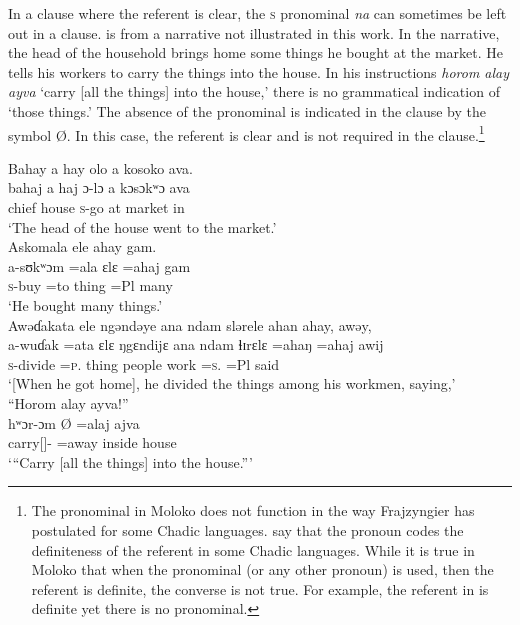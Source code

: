 In a clause where the referent is clear, the \textsc{s} \DO pronominal \textit{na} can sometimes be left out in a clause.  is from a narrative not illustrated in this work. In the narrative, the head of the household brings home some things he bought at the market. He tells his workers to carry the things into the house. In his instructions \textit{horom alay ayva} ‘carry [all the things] into the house,’ there is no grammatical indication of ‘those things.’ The absence of the \DO pronominal is indicated in the clause by the symbol Ø. In this case, the referent is clear and is not required in the clause.\footnote{The \DO pronominal in Moloko does not function in the way Frajzyngier has postulated for some Chadic languages. \citet{FrajzyngierShay2008} say that the \DO pronoun codes the definiteness of the referent in some Chadic languages. While it is true in Moloko that when the \DO pronominal (or any other pronoun) is used, then the referent is definite, the converse is not true. For example, the referent in  is definite yet there is no \DO pronominal. } 

\ea\label{ex:7:43}
Bahay  a  hay  olo  a  kosoko  ava.\\   
\gll bahaj a   haj  ɔ{}-lɔ  a  kɔsɔkʷɔ  ava \\
chief  {\GEN}  house  \textsc{s}-go  at  market  in\\
\glt ‘The head of the house went to the market.’\\
\medskip
Askomala  ele  ahay  gam.\\ 
\gll a-sʊkʷɔm  =ala ɛlɛ =ahaj gam\\
\textsc{s}-buy  =to    thing  =Pl  many\\
\glt ‘He bought many things.’\\
\medskip
Awəɗakata  ele  ngəndəye  ana  ndam  slərele  ahan  ahay,  awəy,\\ 
\gll a-wuɗak =ata ɛlɛ ŋgɛndijɛ ana ndam ɬɪrɛlɛ =ahaŋ =ahaj awij\\
\textsc{s}-divide  =\textsc{p}.{\IO}  thing  {\DEM}  {\DAT} people  work  =\textsc{s}.{\POSS}  =Pl  said\\
\glt ‘[When he got home], he divided the things among his workmen, saying,’\\
\medskip
“Horom alay  ayva!”\\
\gll hʷɔr-ɔm Ø =alaj ajva\\
carry[{\IMP}]-{\twoP}  {}  =away    {inside house}\\
\glt ‘“Carry [all the things] into the house.”’
\z

